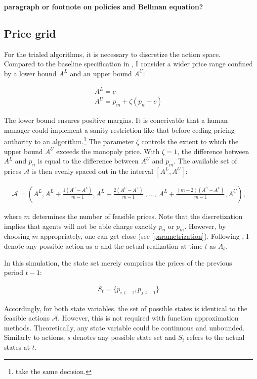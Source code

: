 \textbf{paragraph or footnote on policies and Bellman equation?}


\subsection{Price grid}

For the trialed algorithms, it is necessary to discretize the action space. Compared to the baseline specification in \textcite{calvano_artificial_2020}, I consider a wider price range confined by a lower bound $A^L$ and an upper bound $A^U$:

\begin{gather}\label{price_grid_formula}
A^{L} = c \\
A^{U} = p_m + \zeta (p_n - c)
\end{gather}

The lower bound ensures positive margins. It is conceivable that a human manager could implement a sanity restriction like that before ceding pricing authority to an algorithm.\footnote{\textcite[p.13]{johnson_platform_2020} take the same decision.} The parameter $\zeta$ controls the extent to which the upper bound $A^U$ exceeds the monopoly price. With $\zeta = 1$, the difference between $A^{L}$ and $p_n$ is equal to the difference between $A^{U}$ and $p_m$. The available set of prices $\mathcal{A}$ is then evenly spaced out in the interval $[A^L, A^U]$:

\begin{gather}\label{available_prices}
\mathcal{A} = (A^L, A^L + \frac{1(A^U - A^L)}{m-1}, A^L + \frac{2(A^U - A^L)}{m-1}~ , ... , ~ A^L + \frac{(m-2)(A^U - A^L)}{m-1}, A^U) \text{,}
\end{gather}

where $m$ determines the number of feasible prices. Note that the discretization implies that agents will not be able charge exactly $p_n$ or $p_m$. However, by choosing $m$ appropriately, one can get close (see \autoref{parametrization}). Following \textcite{sutton_reinforcement_2018}, I denote any possible action as $a$ and the actual realization at time $t$ as $A_t$.

In this simulation, the state set merely comprises the prices of the previous period $t-1$:

\begin{gather}
S_t = \{ p_{i, t-1}, p_{j, t-1} \}
\end{gather}

Accordingly, for both state variables, the set of possible states is identical to the feasible actions $\mathcal{A}$. However, this is not required with function approximation methods. Theoretically, any state variable could be continuous and unbounded. Similarly to actions, $s$ denotes any possible state set and $S_t$ refers to the actual states at $t$.


